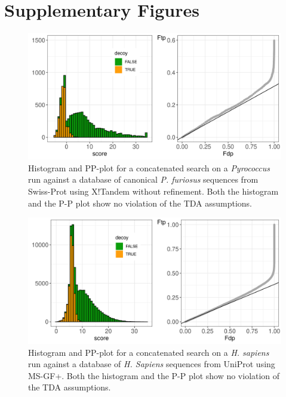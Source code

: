 \newpage

\section{Supplementary Figures}

\renewcommand{\thefigure}{S\arabic{figure}}
\setcounter{figure}{0}
\renewcommand{\figurename}{Supplementary Figure}


\begin{figure}
\includegraphics[width=0.99\linewidth]{./figs/figTandemNoRefineSwissHistPP} \caption{Histogram and PP-plot for a concatenated search on a \emph{Pyrococcus} run against a database of canonical \emph{P. furiosus} sequences from Swiss-Prot using X!Tandem without refinement. Both the histogram and the P-P plot show no violation of the TDA assumptions.}\label{fig:sFig1}
\end{figure}



\begin{figure}
\includegraphics[width=0.99\linewidth]{./figs/figHumanMsgfPlus} \caption{Histogram and PP-plot for a concatenated search on a \emph{H. sapiens} run against a database of \emph{H. Sapiens} sequences from UniProt using MS-GF+. Both the histogram and the P-P plot show no violation of the TDA assumptions.}\label{fig:sFig2}
\end{figure}



